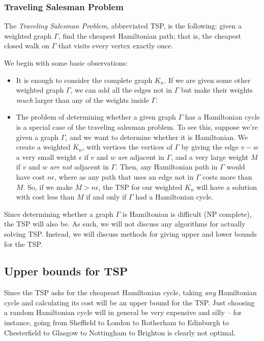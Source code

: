 \documentclass[]{article}
\begin{document}
\subsubsection{Traveling Salesman
Problem}\label{traveling-salesman-problem}

The \emph{Traveling Salesman Problem}, abbreviated TSP, is the
following: given a weighted graph \(\Gamma\), find the cheapest
Hamiltonian path; that is, the cheapest closed walk on \(\Gamma\) that
visits every vertex exactly once.

We begin with some basic observations:

\begin{itemize}
\item
  It is enough to consider the complete graph \(K_n\). If we are given
  some other weighted graph \(\Gamma\), we can add all the edges not in
  \(\Gamma\) but make their weights \emph{much} larger than any of the
  weights inside \(\Gamma\).
\item
  The problem of determining whether a given graph \(\Gamma\) has a
  Hamiltonian cycle is a special case of the traveling salesman problem.
  To see this, suppose we're given a graph \(\Gamma\), and we want to
  determine whether it is Hamiltonian. We create a weighted \(K_n\),
  with vertices the vertices of \(\Gamma\) by giving the edge \(v-w\) a
  very small weight \(\epsilon\) if \(v\) and \(w\) \emph{are} adjacent
  in \(\Gamma\), and a very large weight \(M\) if \(v\) and \(w\)
  \emph{are not} adjacent in \(\Gamma\). Then, any Hamiltonian path in
  \(\Gamma\) would have cost \(n\epsilon\), where as any path that uses
  an edge not in \(\Gamma\) costs more than \(M\). So, if we make
  \(M>n\epsilon\), the TSP for our weighted \(K_n\) will have a solution
  with cost less than \(M\) if and only if \(\Gamma\) had a Hamiltonian
  cycle.
\end{itemize}

Since determining whether a graph \(\Gamma\) is Hamiltonian is difficult
(NP complete), the TSP will also be. As such, we will not discuss any
algorithms for actually solving TSP. Instead, we will discuss methods
for giving upper and lower bounds for the TSP.

\subsection{Upper bounds for TSP}\label{upper-bounds-for-tsp}

Since the TSP asks for the cheapeast Hamiltonian cycle, taking
\emph{any} Hamiltonian cycle and calculating its cost will be an upper
bound for the TSP. Just choosing a random Hamiltonian cycle will in
general be very expensive and silly -- for instance, going from
Sheffield to London to Rotherham to Edinburgh to Chesterfield to Glasgow
to Nottingham to Brighton is clearly not optimal.
\end{document}
